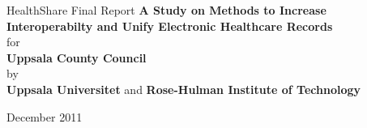 \begin{titlepage}
\begin{center}

\textmd{\large{HealthShare Final Report}}
\vfill
 \huge{\textbf{A Study on Methods to Increase Interoperabilty and Unify Electronic Healthcare Records } }\\[2.0cm]
\large for\\
\large\textbf{Uppsala County Council}\\[1.0cm]
by\\
\large{\textbf{Uppsala Universitet}} and \large{\textbf{Rose-Hulman Institute of Technology}}\\[1.0cm]

\end{center}

\begin{center}
\vfill
December 2011\\
\end{center}

\end{titlepage}